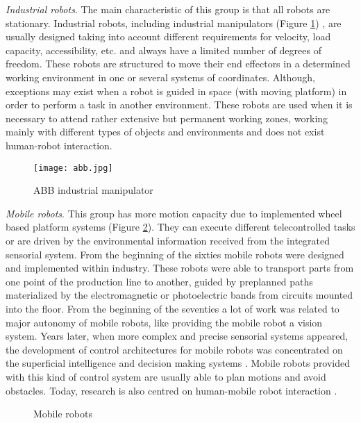 \textit{Industrial robots}. The main characteristic of this group is that all robots are stationary. Industrial robots, including industrial manipulators (Figure \ref{fig:abb}) , are usually designed taking into account different requirements for velocity, load capacity, accessibility, etc. and always have a limited number of degrees of freedom. These robots are structured to move their end effectors in a determined working environment in one or several systems of coordinates. Although, exceptions may exist when a robot is guided in space (with moving platform) in order to perform a task in another environment. These robots are used when it is necessary to attend rather extensive but permanent working zones, working mainly with different types of objects and environments and does not exist human-robot interaction.
\begin{figure}[!hbt]
\centering
\texttt{[image: abb.jpg]}
\caption{ABB industrial manipulator}
\label{fig:abb}
\end{figure}
 
\textit{Mobile robots}. This group has more motion capacity due to implemented wheel based platform systems (Figure \ref{fig:mobile}). They can execute different telecontrolled tasks or are driven by the environmental information received from the integrated sensorial system. 
From the beginning of the sixties mobile robots were designed and implemented within industry. These robots were able to transport parts from one point of the production line to another, guided by preplanned paths materialized by the electromagnetic or photoelectric bands from circuits mounted into the floor. From the beginning of the seventies a lot of work was related to major autonomy of mobile robots, like providing the mobile robot a vision system. Years later, when more complex and precise sensorial systems appeared, the development of control architectures for mobile robots was concentrated on the superficial intelligence and decision making systems \cite{Malfaz2012}. Mobile robots provided with this kind of control system are usually able to plan motions and avoid obstacles. Today, research is also centred on human-mobile robot interaction \cite{Ramey2011}. 

\begin{figure}[!hbt]
\centering
{}\hspace{10mm}
\caption{Mobile robots}
\label{fig:mobile}
\end{figure}

